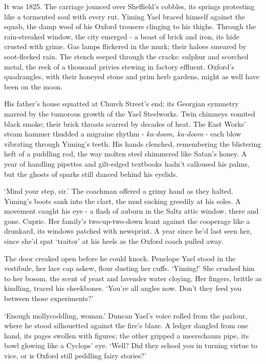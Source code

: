 It was 1825. The carriage jounced over Sheffield's cobbles, its springs protesting like a tormented soul with every rut. Yiming Yael braced himself against the squab, the damp wool of his Oxford trousers clinging to his thighs. Through the rain-streaked window, the city emerged - a beast of brick and iron, its hide crusted with grime. Gas lamps flickered in the murk; their haloes smeared by soot-flecked rain. The stench seeped through the cracks: sulphur and scorched metal, the reek of a thousand privies stewing in factory effluent. Oxford's quadrangles, with their honeyed stone and prim herb gardens, might as well have been on the moon.

His father's house squatted at Church Street's end; its Georgian symmetry marred by the tumorous growth of the Yael Steelworks. Twin chimneys vomited black smoke; their brick throats scarred by decades of heat. The East Works' steam hammer thudded a migraine rhythm - \textit{ka-doom, ka-doom} - each blow vibrating through Yiming's teeth. His hands clenched, remembering the blistering heft of a puddling rod, the way molten steel shimmered like Satan's honey. A year of handling pipettes and gilt-edged textbooks hadn't calloused his palms, but the ghosts of sparks still danced behind his eyelids.

`Mind your step, sir.' The coachman offered a grimy hand as they halted. Yiming's boots sank into the clart, the mud sucking greedily at his soles. A movement caught his eye - a flash of auburn in the Saltz attic window, there and gone. Cupric. Her family's two-up-two-down leant against the cooperage like a drunkard, its windows patched with newsprint. A year since he'd last seen her, since she'd spat `traitor' at his heels as the Oxford coach pulled away.

The door creaked open before he could knock. Penelope Yael stood in the vestibule, her lace cap askew, flour dusting her cuffs. `Yiming!' She crushed him to her bosom, the scent of yeast and lavender water cloying. Her fingers, brittle as kindling, traced his cheekbones. `You're all angles now. Don't they feed you between those experiments?'

`Enough mollycoddling, woman.' Duncan Yael's voice rolled from the parlour, where he stood silhouetted against the fire's blaze. A ledger dangled from one hand, its pages swollen with figures; the other gripped a meerschaum pipe, its bowl glowing like a Cyclops' eye. `Well? Did they school you in turning virtue to vice, or is Oxford still peddling fairy stories?'


